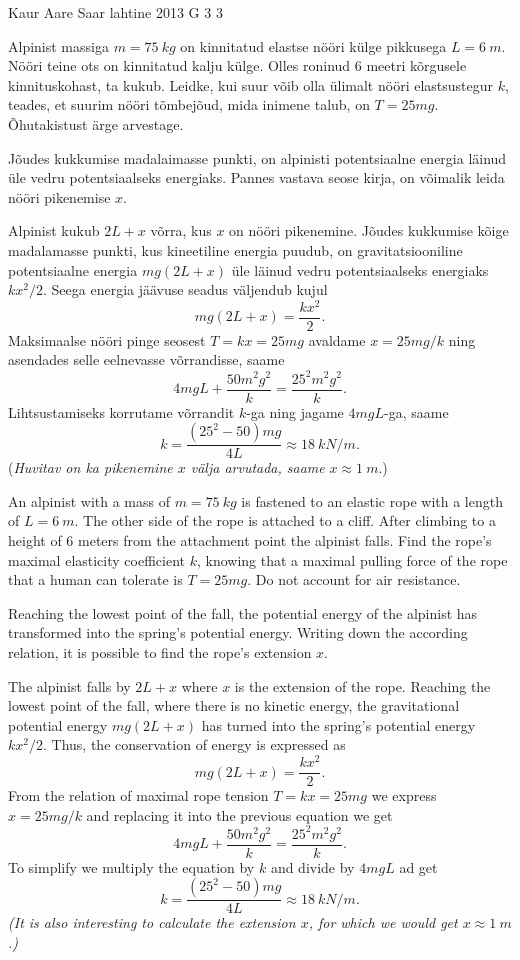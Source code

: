 {Kaur Aare Saar} %
{lahtine} %
{2013} %
{G 3} %
{3} %
{
\ifStatement
Alpinist massiga $m=\SI{75}{kg}$ on kinnitatud elastse nööri külge pikkusega
$L=\SI{6}{m}$. Nööri teine ots on kinnitatud kalju külge. Olles roninud 6 meetri
kõrgusele kinnituskohast, ta kukub. Leidke, kui suur võib olla ülimalt nööri
elastsustegur $k$, teades, et suurim nööri tõmbejõud, mida inimene talub, on
$T=25mg$. Õhutakistust ärge arvestage.
\fi


\ifHint
Jõudes kukkumise madalaimasse punkti, on alpinisti potentsiaalne energia läinud üle vedru potentsiaalseks energiaks. Pannes vastava seose kirja, on võimalik leida nööri pikenemise $x$.
\fi


\ifSolution
Alpinist kukub $2L+x$ võrra, kus $x$ on nööri pikenemine. Jõudes kukkumise kõige madalamasse punkti, kus kineetiline energia puudub, on gravitatsiooniline potentsiaalne energia $mg(2L+x)$ üle läinud vedru potentsiaalseks energiaks $kx^2/2$. Seega energia jäävuse seadus väljendub kujul
\[mg(2L+x)=\frac{kx^2}{2}.\]
Maksimaalse nööri pinge seosest $T=kx=25mg$ avaldame $x=25mg/k$ ning asendades selle eelnevasse võrrandisse, saame
\[4mgL+\frac{50m^2g^2}{k}=\frac{25^2m^2g^2}{k}.\]
Lihtsustamiseks korrutame võrrandit $k$-ga ning jagame $4mgL$-ga, saame
\[k=\frac{(25^2-50)mg}{4L}\approx \SI{18}{kN/m}.\]
({\em Huvitav on ka pikenemine $x$ välja arvutada, saame} $x\approx \SI{1}{m}$.)
\fi


\ifEngStatement
An alpinist with a mass of $m=\SI{75}{kg}$ is fastened to an elastic rope with a length of $L=\SI{6}{m}$. The other side of the rope is attached to a cliff. After climbing to a height of 6 meters from the attachment point the alpinist falls. Find the rope’s maximal elasticity coefficient $k$, knowing that a maximal pulling force of the rope that a human can tolerate is $T=25mg$. Do not account for air resistance.
\fi


\ifEngHint
Reaching the lowest point of the fall, the potential energy of the alpinist has transformed into the spring’s potential energy. Writing down the according relation, it is possible to find the rope’s extension $x$.
\fi


\ifEngSolution
The alpinist falls by $2L+x$ where $x$ is the extension of the rope. Reaching the lowest point of the fall, where there is no kinetic energy, the gravitational potential energy $mg(2L+x)$ has turned into the spring’s potential energy $kx^2/2$. Thus, the conservation of energy is expressed as 
\[mg(2L+x)=\frac{kx^2}{2}.\]
From the relation of maximal rope tension $T=kx=25mg$ we express $x=25mg/k$ and replacing it into the previous equation we get
\[4mgL+\frac{50m^2g^2}{k}=\frac{25^2m^2g^2}{k}.\]
To simplify we multiply the equation by $k$ and divide by $4mgL$ ad get 
\[k=\frac{(25^2-50)mg}{4L}\approx \SI{18}{kN/m}.\] 
\emph{(It is also interesting to calculate the extension $x$, for which we would get $x\approx \SI{1}{m}$.)}
\fi
}